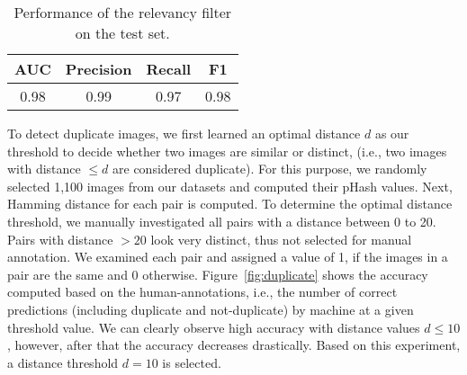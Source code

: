 \documentclass{iscram}
\begin{document}
\begin{table}[htb]
\caption{Performance of the relevancy filter on the test set.}
\centering
\begin{tabular}{cccc}
\toprule
AUC & Precision & Recall & F1 \\
\midrule
0.98 & 0.99 & 0.97  & 0.98 \\
\bottomrule
\end{tabular}
\label{tbl:relevancy_performance}
\end{table}%
To detect duplicate images, we first learned an optimal distance $d$ as our threshold to decide whether two images are similar or distinct, (i.e., two images with distance $\leq d$ are considered duplicate). For this purpose, we randomly selected 1,100 images from our datasets and computed their pHash values. Next, Hamming distance for each pair is computed. To determine the optimal distance threshold, we manually investigated all pairs with a distance between 0 to 20. Pairs with distance $> 20$ look very distinct, thus not selected for manual annotation. We examined each pair and assigned a value of 1, if the images in a pair are the same and 0 otherwise. Figure~\ref{fig:duplicate} shows the accuracy computed based on the human-annotations, i.e., the number of correct predictions (including duplicate and not-duplicate) by machine at a given threshold value. We can clearly observe high accuracy with distance values $d\leq10$, however, after that the accuracy decreases drastically. Based on this experiment, a distance threshold $d=10$ is selected.
\end{document}
